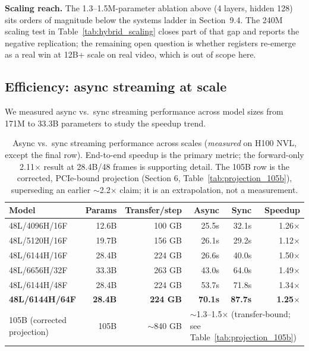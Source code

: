 \documentclass[11pt, letterpaper]{article}
\begin{document}
\textbf{Scaling reach.} The 1.3--1.5M-parameter ablation above (4 layers, hidden 128) sits orders of magnitude below the systems ladder in Section~9.4. The 240M scaling test in Table~\ref{tab:hybrid_scaling} closes part of that gap and reports the negative replication; the remaining open question is whether registers re-emerge as a real win at 12B+ scale on real video, which is out of scope here.

\subsection{Efficiency: async streaming at scale}

We measured async vs.\ sync streaming performance across model sizes from 171M to 33.3B parameters to study the speedup trend.

\begin{table}[h]
\centering
\begin{tabular}{lrrrrr}
\toprule
\textbf{Model} & \textbf{Params} & \textbf{Transfer/step} & \textbf{Async} & \textbf{Sync} & \textbf{Speedup} \\
\midrule
48L/4096H/16F & 12.6B & 100 GB & 25.5s & 32.1s & 1.26$\times$ \\
48L/5120H/16F & 19.7B & 156 GB & 26.1s & 29.2s & 1.12$\times$ \\
48L/6144H/16F & 28.4B & 224 GB & 26.6s & 40.0s & 1.50$\times$ \\
48L/6656H/32F & 33.3B & 263 GB & 43.0s & 64.0s & 1.49$\times$ \\
48L/6144H/48F & 28.4B & 224 GB & 53.7s & 71.8s & 1.34$\times$ \\
\textbf{48L/6144H/64F} & \textbf{28.4B} & \textbf{224 GB} & \textbf{70.1s} & \textbf{87.7s} & \textbf{1.25$\times$} \\
\midrule
105B (corrected projection) & 105B & $\sim$840 GB & \multicolumn{3}{l}{$\sim$1.3--1.5$\times$ (transfer-bound; see Table~\ref{tab:projection_105b})} \\
\bottomrule
\end{tabular}
\caption{Async vs.\ sync streaming performance across scales (\emph{measured} on H100 NVL, except the final row). End-to-end speedup is the primary metric; the forward-only 2.11$\times$ result at 28.4B/48 frames is supporting detail. The 105B row is the corrected, PCIe-bound projection (Section 6, Table~\ref{tab:projection_105b}), superseding an earlier $\sim$2.2$\times$ claim; it is an extrapolation, not a measurement.}
\label{tab:async_streaming}
\end{table}
\end{document}
